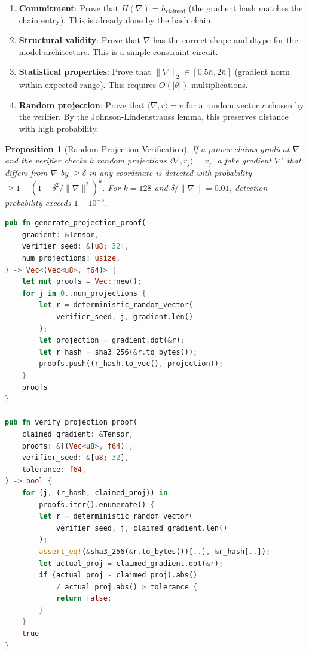 \documentclass[11pt,letterpaper]{article}
\newtheorem{proposition}[theorem]{Proposition}
\begin{document}
\begin{enumerate}
    \item \textbf{Commitment}: Prove that $H(\nabla) = h_{\text{claimed}}$ (the gradient hash matches the chain entry).  This is already done by the hash chain.
    \item \textbf{Structural validity}: Prove that $\nabla$ has the correct shape and dtype for the model architecture.  This is a simple constraint circuit.
    \item \textbf{Statistical properties}: Prove that $\|\nabla\|_2 \in [0.5\bar{n}, 2\bar{n}]$ (gradient norm within expected range).  This requires $O(|\theta|)$ multiplications.
    \item \textbf{Random projection}: Prove that $\langle \nabla, r \rangle = v$ for a random vector $r$ chosen by the verifier.  By the Johnson-Lindenstrauss lemma, this preserves distance with high probability.
\end{enumerate}

\begin{proposition}[Random Projection Verification]
If a prover claims gradient $\nabla$ and the verifier checks $k$ random projections $\langle \nabla, r_j \rangle = v_j$, a fake gradient $\nabla'$ that differs from $\nabla$ by $\geq\delta$ in any coordinate is detected with probability $\geq 1 - (1 - \delta^2 / \|\nabla\|^2)^k$.  For $k = 128$ and $\delta / \|\nabla\| = 0.01$, detection probability exceeds $1 - 10^{-5}$.
\end{proposition}

\begin{lstlisting}[language=Rust,caption=Random projection proof generation]
pub fn generate_projection_proof(
    gradient: &Tensor,
    verifier_seed: &[u8; 32],
    num_projections: usize,
) -> Vec<(Vec<u8>, f64)> {
    let mut proofs = Vec::new();
    for j in 0..num_projections {
        let r = deterministic_random_vector(
            verifier_seed, j, gradient.len()
        );
        let projection = gradient.dot(&r);
        let r_hash = sha3_256(&r.to_bytes());
        proofs.push((r_hash.to_vec(), projection));
    }
    proofs
}

pub fn verify_projection_proof(
    claimed_gradient: &Tensor,
    proofs: &[(Vec<u8>, f64)],
    verifier_seed: &[u8; 32],
    tolerance: f64,
) -> bool {
    for (j, (r_hash, claimed_proj)) in
        proofs.iter().enumerate() {
        let r = deterministic_random_vector(
            verifier_seed, j, claimed_gradient.len()
        );
        assert_eq!(&sha3_256(&r.to_bytes())[..], &r_hash[..]);
        let actual_proj = claimed_gradient.dot(&r);
        if (actual_proj - claimed_proj).abs()
            / actual_proj.abs() > tolerance {
            return false;
        }
    }
    true
}
\end{lstlisting}
\end{document}
